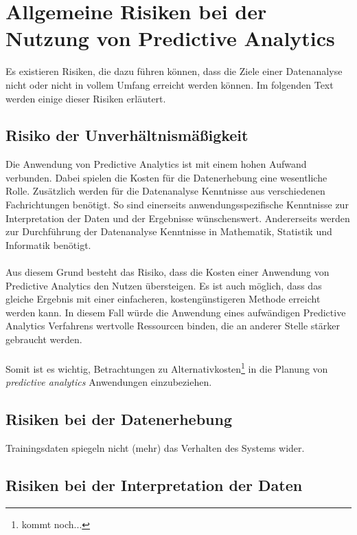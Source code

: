 \section{Allgemeine Risiken bei der Nutzung von Predictive Analytics}

Es existieren Risiken, die dazu führen können, dass die Ziele einer
Datenanalyse nicht oder nicht in vollem Umfang erreicht werden können.
Im folgenden Text werden einige dieser Risiken erläutert.

\subsection{Risiko der Unverhältnismäßigkeit}

Die Anwendung von Predictive Analytics ist mit einem hohen Aufwand verbunden.
Dabei spielen die Kosten für die Datenerhebung eine wesentliche Rolle.
Zusätzlich werden für die Datenanalyse Kenntnisse aus verschiedenen
Fachrichtungen benötigt. So sind einerseits anwendungsspezifische Kenntnisse
zur Interpretation der Daten und der Ergebnisse wünschenswert. Andererseits
werden zur Durchführung der Datenanalyse Kenntnisse in Mathematik, Statistik und
Informatik benötigt. \\ \\
Aus diesem Grund besteht das Risiko, dass die Kosten einer Anwendung von
Predictive Analytics den Nutzen übersteigen. Es ist auch möglich, dass das
gleiche Ergebnis mit einer einfacheren, kostengünstigeren Methode erreicht
werden kann. In diesem Fall würde die Anwendung eines aufwändigen Predictive
Analytics Verfahrens wertvolle Ressourcen binden, die an anderer Stelle stärker
gebraucht werden. \\ \\
Somit ist es wichtig, Betrachtungen zu Alternativkosten\footnote{
kommt noch...
}
in die Planung von \emph{predictive analytics} Anwendungen einzubeziehen. 

\subsection{Risiken bei der Datenerhebung}

Trainingsdaten spiegeln nicht (mehr) das Verhalten des Systems wider.

\subsection{Risiken bei der Interpretation der Daten}

